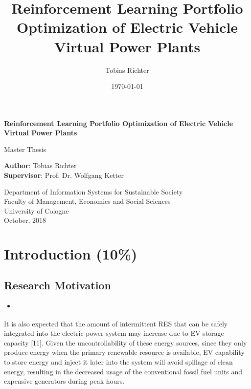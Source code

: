 \documentclass[12pt, article]{article}
\author{Tobias Richter}
\date{\today}
\title{Reinforcement Learning Portfolio Optimization of Electric Vehicle Virtual Power Plants}
\begin{document}
\begin{titlepage}
    \begin{center}
        \vspace*{1cm}

        \Large
        \textbf{Reinforcement Learning Portfolio Optimization of Electric Vehicle Virtual Power Plants}

        \vspace{1.5cm}
        Master Thesis

        \vspace{8.0cm}

        \large
        \textbf{Author}: Tobias Richter\\
        \large
        \textbf{Supervisor}: Prof. Dr. Wolfgang Ketter

        \vspace{1cm}
        \large
        Department of Information Systems for Sustainable Society\\
        Faculty of Management, Economics and Social Sciences\\
        University of Cologne\\

        \vspace{1cm}
        October, 2018

    \end{center}
\end{titlepage}
\setcounter{page}{2}

\tableofcontents
\clearpage
{}

\section{Introduction (10\%)}
\label{sec:org6ab5af2}
\subsection{Research Motivation}
\label{sec:org984852a}
\begin{itemize}
\item \cite{lopes11_integ_elect_vehic_elect_power_system}
\end{itemize}
It is also expected that the amount of intermittent RES
that can be safely integrated into the electric power system
may increase due to EV storage capacity [11]. Given the
uncontrollability of these energy sources, since they only
produce energy when the primary renewable resource is
available, EV capability to store energy and inject it later
into the system will avoid spillage of clean energy,
resulting in the decreased usage of the conventional fossil
fuel units and expensive generators during peak hours.
\end{document}
